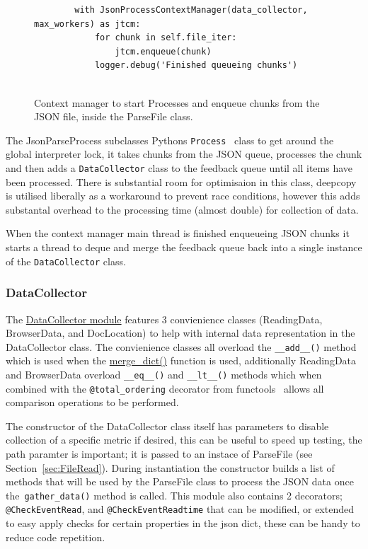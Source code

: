 \documentclass[11pt]{article}
\newcommand{\code}[1]{\colorbox{light-gray}{\texttt{#1}}}
\begin{document}
\begin{figure}[h]
    \begin{verbatim}
        with JsonProcessContextManager(data_collector, max_workers) as jtcm:
            for chunk in self.file_iter:
                jtcm.enqueue(chunk)
            logger.debug('Finished queueing chunks')
        
    \end{verbatim}
    \caption{Context manager to start Processes and enqueue chunks from the JSON file, inside the ParseFile class.}
    \label{fig:JSONPContextManager}
\end{figure}

The JsonParseProcess subclasses Pythons \code{Process}~\autocite{MultiprocessingProcessbasedParallelism} class to get around the global interpreter lock, it takes chunks from the JSON queue, processes the chunk and then adds a \code{DataCollector} class to the feedback queue until all items have been processed. 
There is substantial room for optimisaion in this class, deepcopy is utilised liberally as a workaround to prevent race conditions, however this adds substantal overhead to the processing time (almost double) for collection of data.

When the context manager main thread is finished enqueueing JSON chunks it starts a thread to deque and merge the feedback queue back into a single instance of the \code{DataCollector} class.

\subsubsection{DataCollector}
The \href{https://www2.macs.hw.ac.uk/~sf52/DocuTrace/html/DocuTrace.Analysis.html#module-DocuTrace.Analysis.DataCollector}{DataCollector module} features 3 convienience classes (ReadingData, BrowserData, and DocLocation) to help with internal data representation in the DataCollector class. The convienience classes all overload the \code{\_\_add\_\_()} method which is used when the \href{https://www2.macs.hw.ac.uk/~sf52/DocuTrace/html/DocuTrace.Analysis.html#DocuTrace.Analysis.DataCollector.merge_dict}{merge\_dict()} function is used, additionally ReadingData and BrowserData overload \code{\_\_eq\_\_()} and \code{\_\_lt\_\_()} methods which when combined with the \code{@total\_ordering} decorator from functools~\autocite{FunctoolsHigherorderFunctions} allows all comparison operations to be performed.

The constructor of the DataCollector class itself has parameters to disable collection of a specific metric if desired, this can be useful to speed up testing, the path paramter is important; it is passed to an instace of ParseFile (see Section~\ref{sec:FileRead}). During instantiation the constructor builds a list of methods that will be used by the ParseFile class to process the JSON data once the~\code{gather\_data()} method is called.
This module also contains 2 decorators; \code{@CheckEventRead}, and \code{@CheckEventReadtime} that can be modified, or extended to easy apply checks for certain properties in the json dict, these can be handy to reduce code repetition.
\end{document}
